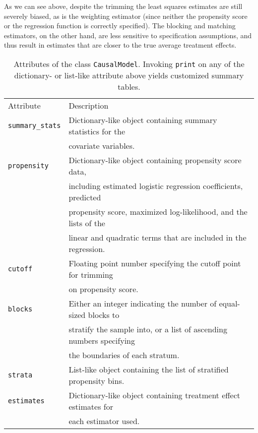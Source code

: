 \documentclass[12pt]{article}
\theoremstyle{definition}
\theoremstyle{definition}
\theoremstyle{definition}
\theoremstyle{remark}
\begin{document}
As we can see above, despite the trimming the least squares estimates are still severely biased, as is the weighting estimator (since neither the propensity score or the regression function is correctly specified). The blocking and matching estimators, on the other hand, are less sensitive to specification assumptions, and thus result in estimates that are closer to the true average treatment effects.






\begin{table}[ht]
\begin{center}\begin{tabular}{ll}
Attribute & Description \\
\texttt{summary\_stats} & Dictionary-like object containing summary statistics for the \\
& covariate variables. \\
\texttt{propensity} & Dictionary-like object containing propensity score data, \\
& including estimated logistic regression coefficients, predicted \\
& propensity score, maximized log-likelihood, and the lists of the \\
& linear and quadratic terms that are included in the regression. \\
\texttt{cutoff} & Floating point number specifying the cutoff point for trimming \\
& on propensity score.\\
\texttt{blocks} & Either an integer indicating the number of equal-sized blocks to \\
& stratify the sample into, or a list of ascending numbers specifying \\
& the boundaries of each stratum. \\
\texttt{strata} & List-like object containing the list of stratified propensity bins. \\
\texttt{estimates} & Dictionary-like object containing treatment effect estimates for \\
& each estimator used.
\end{tabular}\end{center}
\caption{Attributes of the class \texttt{CausalModel}. Invoking \texttt{print} on any of the dictionary- or list-like attribute above yields customized summary tables.}  \label{tab.a}
\end{table}
\end{document}
